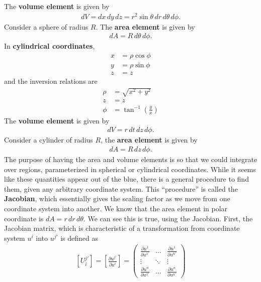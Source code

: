 \documentclass{article}
\theoremstyle{definition}
\begin{document}
The \textbf{volume element} is given by
\begin{align*}
dV = dx\,dy\,dz = r^2\sin\theta\,dr\,d\theta\,d\phi.
\end{align*}
Consider a sphere of radius $R$. The \textbf{area element} is given by
\begin{align*}
dA = R\,d\theta\,d\phi.
\end{align*}
In \textbf{cylindrical coordinates},
\begin{align*}
x &= \rho\cos\phi\\
y &= \rho\sin\phi\\
z &= z
\end{align*}
and the inversion relations are
\begin{align*}
\rho &= \sqrt{x^2+y^2}\\
z &= z\\
\phi &= \tan^{-1}\left(\frac{y}{x}\right) 
\end{align*}
The \textbf{volume element} is given by
\begin{align*}
dV = r\,dt\,dz\,d\phi.
\end{align*}
Consider a cylinder of radius $R$, the \textbf{area element} is given by 
\begin{align*}
dA = R\,dz\,d\phi.
\end{align*}
The purpose of having the area and volume elements is so that we could integrate over regions, parameterized in spherical or cylindrical coordinates. While it seems like these quantities appear out of the blue, there is a general procedure to find them, given any arbitrary coordinate system. This ``procedure'' is called the \textbf{Jacobian}, which essentially gives the scaling factor as we move from one coordinate system into another. We know that the area element in polar coordinate is $dA = r\,dr\,d\theta$. We can see this is true, using the Jacobian. First, the Jacobian matrix, which is characteristic of a transformation from coordinate system $u^i$ into $u^{j'}$ is defined as
\begin{align*}
\boxed{[U^{j'}_{i}] = \left[ \frac{\partial u^{j'}}{\partial u^{i}} \right] = 
\begin{pmatrix}
\frac{\partial u^1}{\partial u^{1'}} & \dots & \frac{\partial u^1}{\partial u^{n'}}\\
\vdots & \ddots & \vdots\\
\frac{\partial u^n}{\partial u^{1'}} & \dots & \frac{\partial u^n}{\partial u^{n'}}
\end{pmatrix}}
\end{align*}
\end{document}
